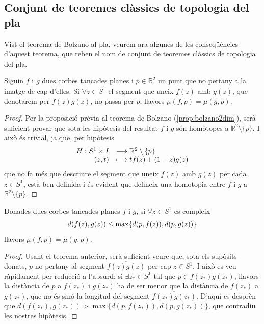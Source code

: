 \documentclass[../main.tex]{subfiles}
\begin{document}
\subsection{Conjunt de teoremes clàssics de topologia del pla}

Vist el teorema de Bolzano al pla, veurem ara algunes de les conseqüències d'aquest teorema, que reben el nom de conjunt de teoremes clàssics de topologia del pla.

\begin{ter}
\label{ter:poincarebohl} Siguin $f$ i $g$ dues corbes tancades planes i $p\in\mathbb{R}^2$ un punt que no pertany a la imatge de cap d'elles. Si $\forall z\in S^1$ el segment que uneix $f(z)$ amb $g(z)$, que denotarem per $\overline{f(z)g(z)}$, no passa per $p$, llavors $\mu(f,p) = \mu(g,p)$.
\end{ter}
\begin{proof}
Per la proposició prèvia al teorema de Bolzano (\ref{prop:bolzano2dim}), serà suficient provar que sota les hipòtesis del resultat $f$ i $g$ són homòtopes a $\mathbb{R}^2\setminus\{p\}$. I això és trivial, ja que, per hipòtesis
\begin{equation}
    \notag
    \begin{array}{rl}
        H:S^1\times I & \longrightarrow\mathbb{R}^2\setminus\{p\} \\
        (z,t) & \longmapsto tf(z)+(1-z)g(z)
    \end{array}
\end{equation}
que no fa més que descriure el segment que uneix $f(z)$ amb $g(z)$ per cada $z\in S^1$, està ben definida i és evident que defineix una homotopia entre $f$ i $g$ a $\mathbb{R}^2\setminus\{p\}$.
\end{proof}


\begin{ter}
\label{ter:teoremaderouche}\label{exercici2.13} Donades dues corbes tancades planes $f$ i $g$, si $\forall z\in S^1$ es compleix
\begin{equation}
    \notag
    d(f(z),g(z))\leq \max\{d(p,f(z)),d(p,g(z))\}
\end{equation}
llavors $\mu(f,p) = \mu(g,p)$.
\end{ter}
\begin{proof}
Usant el teorema anterior, serà suficient veure que, sota els supòsits donats, $p$ no pertany al segment $\overline{f(z)g(z)}$ per cap $z\in S^1$. I això es veu ràpidament per reducció a l'absurd: si $\exists z_*\in S^1$ tal que $p\in \overline{f(z_*)g(z_*)}$, llavors la distància de $p$ a $f(z_*)$ i $g(z_*)$ ha de ser menor que la distància de $f(z_*)$ a $g(z_*)$, que no és sinó la longitud del segment $\overline{f(z_*)g(z_*)}$. D'aquí es desprèn que $d(f(z_*),g(z_*))>\max\{d(p,f(z_*)),d(p,g(z_*))\}$, que contradiu les nostres hipòtesis.
\end{proof}
\end{document}
